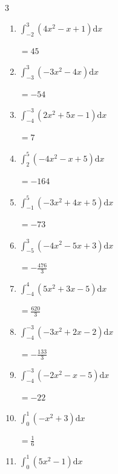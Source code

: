 \begin{multicols}{3}
\begin{enumerate}
        $\displaystyle =-\frac{37}{3}$

  \item $\displaystyle \int_{-2}^{3}\left( 4x^{2}-x+1 \right) \mathrm{d}x$

        $\displaystyle =45$

  \item $\displaystyle \int_{-3}^{3}\left( -3x^{2}-4x \right) \mathrm{d}x$

        $\displaystyle =-54$

  \item $\displaystyle \int_{-4}^{-3}\left( 2x^{2}+5x-1 \right) \mathrm{d}x$

        $\displaystyle =7$

  \item $\displaystyle \int_{2}^{5}\left( -4x^{2}-x+5 \right) \mathrm{d}x$

        $\displaystyle =-164$

\columnbreak %

  \item $\displaystyle \int_{-1}^{5}\left( -3x^{2}+4x+5 \right) \mathrm{d}x$

        $\displaystyle =-73$

  \item $\displaystyle \int_{-5}^{3}\left( -4x^{2}-5x+3 \right) \mathrm{d}x$

        $\displaystyle =-\frac{476}{3}$

  \item $\displaystyle \int_{-4}^{4}\left( 5x^{2}+3x-5 \right) \mathrm{d}x$

        $\displaystyle =\frac{620}{3}$

  \item $\displaystyle \int_{-4}^{-3}\left( -3x^{2}+2x-2 \right) \mathrm{d}x$

        $\displaystyle =-\frac{133}{3}$

  \item $\displaystyle \int_{-4}^{-3}\left( -2x^{2}-x-5 \right) \mathrm{d}x$

        $\displaystyle =-22$

\columnbreak %

\resetques

  \item $\displaystyle \int_{0}^{1}\left( -x^{2}+3 \right) \mathrm{d}x$

        $\displaystyle =\frac{1}{6}$

  \item $\displaystyle \int_{0}^{1}\left( 5x^{2}-1 \right) \mathrm{d}x$


\end{enumerate}
\end{multicols}
